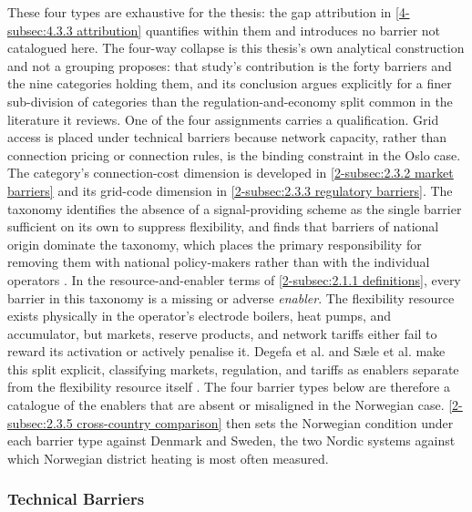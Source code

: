 These four types are exhaustive for the thesis: the gap attribution in \autoref{4-subsec:4.3.3 attribution} quantifies within them and introduces no barrier not catalogued here. The four-way collapse is this thesis's own analytical construction and not a grouping \cite{sneum_barriers_2021} proposes: that study's contribution is the forty barriers and the nine categories holding them, and its conclusion argues explicitly for a finer sub-division of categories than the regulation-and-economy split common in the literature it reviews. One of the four assignments carries a qualification. Grid access is placed under technical barriers because network capacity, rather than connection pricing or connection rules, is the binding constraint in the Oslo case. The category's connection-cost dimension is developed in \autoref{2-subsec:2.3.2 market barriers} and its grid-code dimension in \autoref{2-subsec:2.3.3 regulatory barriers}. The taxonomy identifies the absence of a signal-providing scheme as the single barrier sufficient on its own to suppress flexibility, and finds that barriers of national origin dominate the taxonomy, which places the primary responsibility for removing them with national policy-makers rather than with the individual operators \cite{sneum_barriers_2021}. In the resource-and-enabler terms of \autoref{2-subsec:2.1.1 definitions}, every barrier in this taxonomy is a missing or adverse \textit{enabler}. The flexibility resource exists physically in the operator's electrode boilers, heat pumps, and accumulator, but markets, reserve products, and network tariffs either fail to reward its activation or actively penalise it. Degefa et al. and Sæle et al. make this split explicit, classifying markets, regulation, and tariffs as enablers separate from the flexibility resource itself \cite{degefa_comprehensive_2021, saele_understanding_2023}. The four barrier types below are therefore a catalogue of the enablers that are absent or misaligned in the Norwegian case. \autoref{2-subsec:2.3.5 cross-country comparison} then sets the Norwegian condition under each barrier type against Denmark and Sweden, the two Nordic systems against which Norwegian district heating is most often measured.

\subsubsection{Technical Barriers}
\label{2-subsec:2.3.1 tech barriers}

